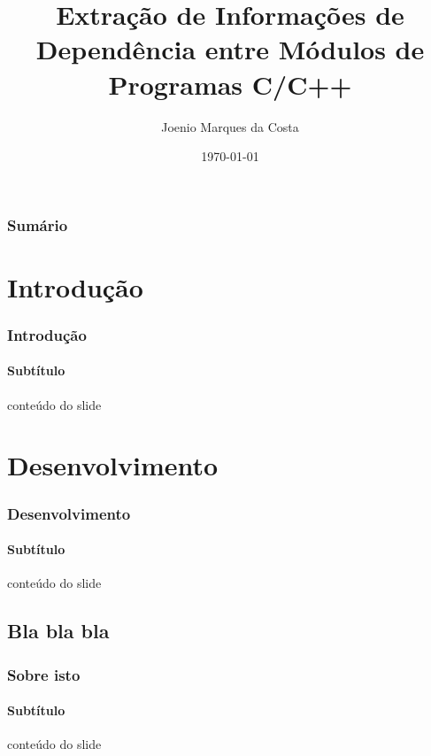 \documentclass{beamer}
\title[Extração automática de grafos de colaboração]{Extração de Informações de Dependência entre Módulos de Programas C/C++}
\author[Joenio Costa]{Joenio Marques da Costa}
\institute{Universidade Católica do Salvador}
\date{\today}
\begin{document}
\frame{\titlepage} %

\begin{frame}
 \frametitle{Sumário}
 \tableofcontents
\end{frame}

\section{Introdução}

\begin{frame}
\frametitle{Introdução}
\framesubtitle{Subtítulo}
 conteúdo do slide
\end{frame}

\section{Desenvolvimento}

\begin{frame}
\frametitle{Desenvolvimento}
\framesubtitle{Subtítulo}
 conteúdo do slide
\end{frame}

\subsection{Bla bla bla}

\begin{frame}
\frametitle{Sobre isto}
\framesubtitle{Subtítulo}
 conteúdo do slide
\end{frame}
\end{document}
